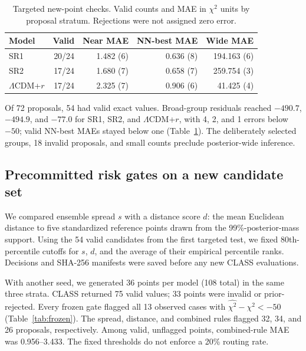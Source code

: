 \documentclass[a4paper,conference,10pt]{IEEEtran}
\begin{document}
\begin{table}[t]
\caption{Targeted new-point checks. Valid counts and MAE in $\chi^2$
units by proposal stratum. Rejections were not assigned zero error.}
\label{tab:prospective}
\centering\footnotesize
\setlength{\tabcolsep}{3.3pt}
\begin{tabular}{@{}lrrrr@{}}
\toprule
Model & Valid & Near MAE & NN-best MAE & Wide MAE\\
\midrule
SR1 & 20/24 & 1.482 (6) & 0.636 (8) & 194.163 (6)\\
SR2 & 17/24 & 1.680 (7) & 0.658 (7) & 259.754 (3)\\
$\Lambda$CDM+$r$ & 17/24 & 2.325 (7) & 0.906 (6) & 41.425 (4)\\
\bottomrule
\end{tabular}
\end{table}

Of 72 proposals, 54 had valid exact values. Broad-group residuals reached $-490.7$, $-494.9$, and $-77.0$ for SR1, SR2, and $\Lambda$CDM+$r$, with 4, 2, and 1 errors below $-50$; valid NN-best MAEs stayed below one (Table~\ref{tab:prospective}). The deliberately selected groups, 18 invalid proposals, and small counts preclude posterior-wide inference.


\subsection{Precommitted risk gates on a new candidate set}
We compared ensemble spread $s$ with a distance score $d$: the mean Euclidean distance to five standardized reference points drawn from the 99\%-posterior-mass support. Using the 54 valid candidates from the first targeted test, we fixed 80th-percentile cutoffs for $s$, $d$, and the average of their empirical percentile ranks. Decisions and SHA-256 manifests were saved before any new CLASS evaluations.

With another seed, we generated 36 points per model (108 total) in the same three strata. CLASS returned 75 valid values; 33 points were invalid or prior-rejected. Every frozen gate flagged all 13 observed cases with $\widehat{\chi^2}-\chi^2<-50$ (Table~\ref{tab:frozen}). The spread, distance, and combined rules flagged 32, 34, and 26 proposals, respectively. Among valid, unflagged points, combined-rule MAE was 0.956--3.433. The fixed thresholds do not enforce a 20\% routing rate.
\end{document}
